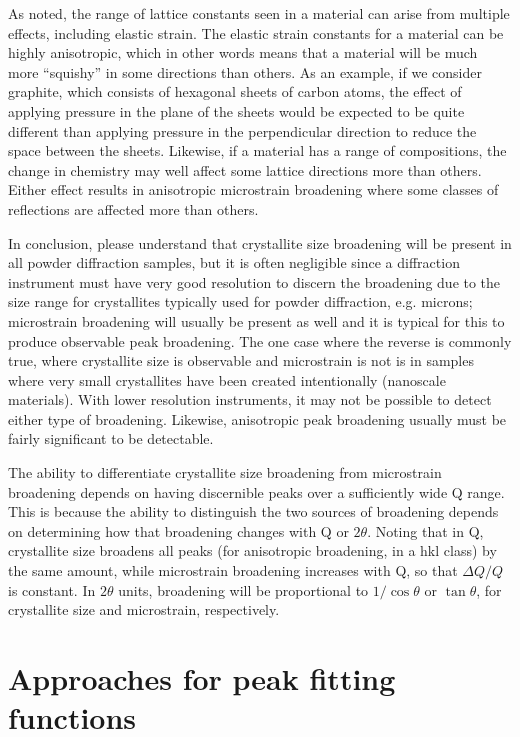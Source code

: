 As noted, the range of lattice constants seen in a material can arise from multiple effects, including elastic strain. The elastic strain constants for a material can be highly anisotropic, which in other words means that a material will be much more “squishy” in some directions than others. As an example, if we consider graphite, which consists of hexagonal sheets of carbon atoms, the effect of applying pressure in the plane of the sheets would be expected to be quite different than applying pressure in the perpendicular direction to reduce the space between the sheets. Likewise, if a material has a range of compositions, the change in chemistry may well affect some lattice directions more than others. Either effect results in anisotropic microstrain broadening where some classes of reflections are affected more than others.


In conclusion, please understand that crystallite size broadening will be present in all powder diffraction samples, but it is often negligible since a diffraction instrument must have very good resolution to discern the broadening due to the size range for crystallites typically used for powder diffraction, e.g. microns; microstrain broadening will usually be present as well and it is typical for this to produce observable peak broadening. The one case where the reverse is commonly true, where crystallite size is observable and microstrain is not is in samples where very small crystallites have been created intentionally (nanoscale materials). With lower resolution instruments, it may not be possible to detect either type of broadening. Likewise, anisotropic peak broadening usually must be fairly significant to be detectable. 

The ability to differentiate crystallite size broadening from microstrain broadening depends on having discernible peaks over a sufficiently wide Q range. This is because the ability to distinguish the two sources of broadening depends on determining how that broadening changes with Q or $2\theta$. Noting that in Q, crystallite size broadens all peaks (for anisotropic broadening, in a hkl class) by the same amount, while microstrain broadening increases with Q, so that $\Delta Q/Q$ is constant. In $2\theta$ units, broadening will be proportional to $1/\cos\theta$ or $\tan\theta$, for crystallite size and microstrain, respectively. 

\section{Approaches for peak fitting functions}

